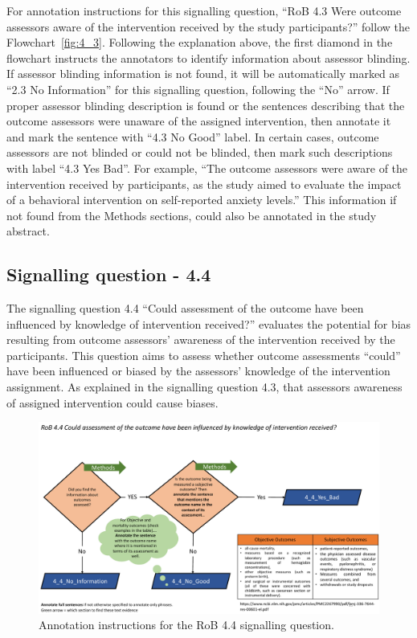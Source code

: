 \documentclass[sn-mathphys,Numbered]{sn-jnl}%
\begin{document}
For annotation instructions for this signalling question, ``RoB 4.3 Were outcome assessors aware of the intervention received by the study participants?'' follow the Flowchart~\ref{fig:4_3}.
Following the explanation above, the first diamond in the flowchart instructs the annotators to identify information about assessor blinding. 
If assessor blinding information is not found, it will be automatically marked as ``2.3 No Information'' for this signalling question, following the  ``No'' arrow.
If proper assessor blinding description is found or the sentences describing that the outcome assessors were unaware of the assigned intervention, then annotate it and mark the sentence with ``4.3 No Good'' label.
In certain cases, outcome assessors are not blinded or could not be blinded, then mark such descriptions with label ``4.3 Yes Bad''.
For example, ``The outcome assessors were aware of the intervention received by participants, as the study aimed to evaluate the impact of a behavioral intervention on self-reported anxiety levels.''
This information if not found from the Methods sections, could also be annotated in the study abstract.

%
%
%
\subsection*{Signalling question - 4.4 }
\label{subsec:4_4}
%
The signalling question 4.4 ``Could assessment of the outcome have been influenced by knowledge of intervention received?'' evaluates the potential for bias resulting from outcome assessors' awareness of the intervention received by the participants.
This question aims to assess whether outcome assessments ``could'' have been influenced or biased by the assessors' knowledge of the intervention assignment.
As explained in the signalling question 4.3, that assessors awareness of assigned intervention could cause biases.

%
%
%
\begin{figure}[hbt]
    \centering
    \includegraphics[width=\textwidth]{figures/4_4.pdf}
    \caption{Annotation instructions for the RoB 4.4 signalling question.}
    \label{fig:4_4}
\end{figure}
\end{document}
